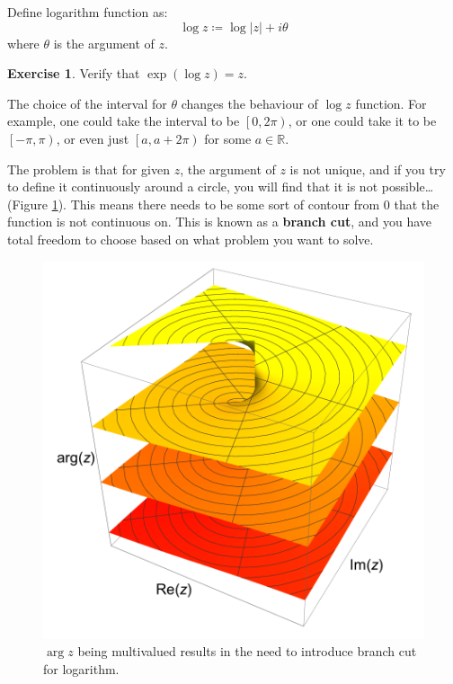 \documentclass[a4paper, 12pt]{article}
\theoremstyle{definition}
\newtheorem{exercise}{Exercise}
\numberwithin{theorem}{section}
\numberwithin{definition}{section}
\numberwithin{exercise}{section}
\numberwithin{remark}{section}
\numberwithin{figure}{section}
\numberwithin{example}{section}
\newcommand{\R}{\mathbb{R}}
\begin{document}
Define logarithm function as:
\begin{equation*}
    \log z \coloneqq \log |z| + i \theta
\end{equation*}
where $\theta$ is the argument of $z$.

\begin{exercise}
    Verify that $\exp \left( \log z \right) = z$.
\end{exercise}

The choice of the interval for $\theta$ changes the behaviour of $\log z$ function.
For example, one could take the interval to be $\left[ 0, 2\pi \right)$,
or one could take it to be $\left[ - \pi, \pi \right)$,
or even just $\left[a, a + 2\pi\right)$ for some $a \in \R$.

The problem is that for given $z$, the argument of $z$ is not unique,
and if you try to define it continuously around a circle,
you will find that it is not possible\dots
(Figure \ref{fig: arg z multivalued}).
This means there needs to be some sort of contour from 0 that the function is not continuous on.
This is known as a \textbf{branch cut}, and you have total freedom to choose
based on what problem you want to solve.

\begin{figure}[tbp]
    \centering
    \includegraphics[scale=0.5]{argz}
    \caption{$\arg z$ being multivalued results in the need to introduce branch cut for logarithm.}
    \label{fig: arg z multivalued}
\end{figure}
\end{document}

